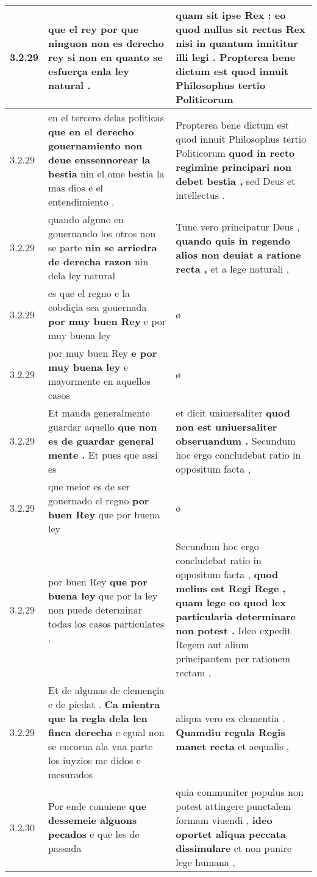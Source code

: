 \begin{tabular}{|p{1cm}|p{6.5cm}|p{6.5cm}|}
3.2.29 & que el rey \textbf{ por que ninguon non es derecho rey } si non en quanto se esfuerça enla ley natural . & quam sit ipse Rex : \textbf{ eo quod nullus sit rectus Rex nisi in quantum innititur illi legi . } Propterea bene dictum est quod innuit Philosophus tertio Politicorum \\\hline
3.2.29 & en el tercero delas politicas \textbf{ que en el derecho gouernamiento non deue enssennorear la bestia } nin el ome bestia la mas dios e el entendimiento . & Propterea bene dictum est quod innuit Philosophus tertio Politicorum \textbf{ quod in recto regimine principari non debet bestia , } sed Deus et intellectus . \\\hline
3.2.29 & quando alguno en gouernando los otros non se parte \textbf{ nin se arriedra de derecha razon } nin dela ley natural & Tunc vero principatur Deus , \textbf{ quando quis in regendo alios non deuiat a ratione recta , } et a lege naturali , \\\hline
3.2.29 & es que el regno e la cobdiçia sea gouernada \textbf{ por muy buen Rey } e por muy buena ley & ø \\\hline
3.2.29 & por muy buen Rey \textbf{ e por muy buena ley } e mayormente en aquellos casos & ø \\\hline
3.2.29 & Et manda generalmente guardar aquello \textbf{ que non es de guardar general mente . } Et pues que assi es & et dicit uniuersaliter \textbf{ quod non est uniuersaliter obseruandum . } Secundum hoc ergo concludebat ratio in oppositum facta , \\\hline
3.2.29 & que meior es de ser gouernado el regno \textbf{ por buen Rey } que por buena ley & ø \\\hline
3.2.29 & por buen Rey \textbf{ que por buena ley } que por la ley non puede determinar todas los casos particulates . & Secundum hoc ergo concludebat ratio in oppositum facta , \textbf{ quod melius est Regi Rege , quam lege eo quod lex particularia determinare non potest . } Ideo expedit Regem aut alium principantem per rationem rectam , \\\hline
3.2.29 & Et de algunas de clemençia e de piedat . \textbf{ Ca mientra que la regla dela len finca derecha } e egual non se encorua ala vna parte los iuyzios me didos e mesurados & aliqua vero ex clementia . \textbf{ Quamdiu regula Regis manet recta } et aequalis , \\\hline
3.2.30 & Por ende conuiene \textbf{ que dessemeie alguons pecados } e que les de passada & quia communiter populus non potest attingere punctalem formam viuendi , \textbf{ ideo oportet aliqua peccata dissimulare } et non punire lege humana , \\\hline

\end{tabular}
